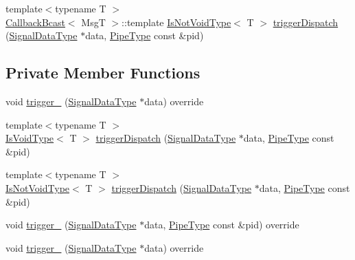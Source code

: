 \begin{DoxyCompactItemize}
\item 
{\footnotesize template$<$typename T $>$ }\\\hyperlink{structvt_1_1pipe_1_1callback_1_1_callback_bcast}{Callback\+Bcast}$<$ MsgT $>$\+::template \hyperlink{structvt_1_1pipe_1_1callback_1_1_callback_bcast_a3f5efa2edf7f4c47fe047e086e63a477}{Is\+Not\+Void\+Type}$<$ T $>$ \hyperlink{structvt_1_1pipe_1_1callback_1_1_callback_bcast_aad21dba24d76c98715a077f8e2b885ff}{trigger\+Dispatch} (\hyperlink{structvt_1_1pipe_1_1callback_1_1_callback_bcast_aaf994b71056001334d30d74fa9c958f9}{Signal\+Data\+Type} $\ast$data, \hyperlink{namespacevt_ac9852acda74d1896f48f406cd72c7bd3}{Pipe\+Type} const \&pid)
\end{DoxyCompactItemize}
\subsection*{Private Member Functions}
\begin{DoxyCompactItemize}
\item 
void \hyperlink{structvt_1_1pipe_1_1callback_1_1_callback_bcast_a839f195f5e4dae3251d67163016ae703}{trigger\+\_\+} (\hyperlink{structvt_1_1pipe_1_1callback_1_1_callback_bcast_aaf994b71056001334d30d74fa9c958f9}{Signal\+Data\+Type} $\ast$data) override
\item 
{\footnotesize template$<$typename T $>$ }\\\hyperlink{structvt_1_1pipe_1_1callback_1_1_callback_bcast_a3ca08c23824cfac76b837311a1d2c929}{Is\+Void\+Type}$<$ T $>$ \hyperlink{structvt_1_1pipe_1_1callback_1_1_callback_bcast_a8db0ff95fe319e739a93e87661365a5a}{trigger\+Dispatch} (\hyperlink{structvt_1_1pipe_1_1callback_1_1_callback_bcast_aaf994b71056001334d30d74fa9c958f9}{Signal\+Data\+Type} $\ast$data, \hyperlink{namespacevt_ac9852acda74d1896f48f406cd72c7bd3}{Pipe\+Type} const \&pid)
\item 
{\footnotesize template$<$typename T $>$ }\\\hyperlink{structvt_1_1pipe_1_1callback_1_1_callback_bcast_a3f5efa2edf7f4c47fe047e086e63a477}{Is\+Not\+Void\+Type}$<$ T $>$ \hyperlink{structvt_1_1pipe_1_1callback_1_1_callback_bcast_a6a0c65ef395baea684879a696e9fa8f1}{trigger\+Dispatch} (\hyperlink{structvt_1_1pipe_1_1callback_1_1_callback_bcast_aaf994b71056001334d30d74fa9c958f9}{Signal\+Data\+Type} $\ast$data, \hyperlink{namespacevt_ac9852acda74d1896f48f406cd72c7bd3}{Pipe\+Type} const \&pid)
\item 
void \hyperlink{structvt_1_1pipe_1_1callback_1_1_callback_bcast_a8c7fea2fd47017f1cd55f249ce5111a0}{trigger\+\_\+} (\hyperlink{structvt_1_1pipe_1_1callback_1_1_callback_bcast_aaf994b71056001334d30d74fa9c958f9}{Signal\+Data\+Type} $\ast$data, \hyperlink{namespacevt_ac9852acda74d1896f48f406cd72c7bd3}{Pipe\+Type} const \&pid) override
\item 
void \hyperlink{structvt_1_1pipe_1_1callback_1_1_callback_bcast_acc7d0eda09ac15644f876fdab691e269}{trigger\+\_\+} (\hyperlink{structvt_1_1pipe_1_1callback_1_1_callback_bcast_aaf994b71056001334d30d74fa9c958f9}{Signal\+Data\+Type} $\ast$data) override
\end{DoxyCompactItemize}
